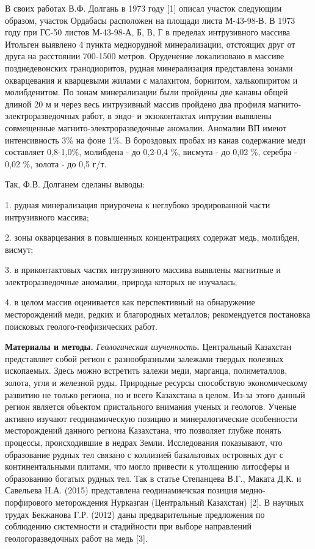 \begin{multicols}{2}
В своих работах В.Ф. Долгань в 1973 году {[}1{]} описал участок
следующим образом, участок Ордабасы расположен на площади листа
М-43-98-В. В 1973 году при ГС-50 листов М-43-98-А, Б, В, Г в пределах
интрузивного массива Итольген выявлено 4 пункта меднорудной
минерализации, отстоящих друг от друга на расстоянии 700-1500 метров.
Оруденение локализовано в массиве позднедевонских гранодиоритов, рудная
минерализация представлена зонами окварцевания и кварцевыми жилами с
малахитом, борнитом, халькопиритом и молибденитом. По зонам
минерализации были пройдены две канавы общей длиной 20 м и через весь
интрузивный массив пройдено два профиля магнито-электроразведочных
работ, в эндо- и экзоконтактах интрузии выявлены совмещенные
магнито-электроразведочные аномалии. Аномалии ВП имеют интенсивность 3\%
на фоне 1\%. В бороздовых пробах из канав содержание меди составляет
0,8-1,0\%, молибдена - до 0,2-0,4 \%, висмута - до 0,02 \%, серебра -
0,02 \%, золота - до 0,5 г/т.

Так, Ф.В. Долганем сделаны выводы:

1. рудная минерализация приурочена к неглубоко эродированной части
интрузивного массива;

2. зоны окварцевания в повышенных концентрациях содержат медь, молибден,
висмут;

3. в приконтактовых частях интрузивного массива выявлены магнитные и
электроразведочные аномалии, природа которых не изучалась;

4. в целом массив оценивается как перспективный на обнаружение
месторождений меди, редких и благородных металлов; рекомендуется
постановка поисковых геолого-геофизических работ.

{\bfseries Материалы и методы.} \emph{Геологическая изученность}{\bfseries .}
Центральный Казахстан представляет собой регион с разнообразными
залежами твердых полезных ископаемых. Здесь можно встретить залежи меди,
марганца, полиметаллов, золота, угля и железной руды. Природные ресурсы
способствую экономическому развитию не только региона, но и всего
Казахстана в целом. Из-за этого данный регион является объектом
пристального внимания ученых и геологов. Ученые активно изучают
геодинамическую позицию и минералогические особенности месторождений
данного региона Казахстана, что позволяет глубже понять процессы,
происходившие в недрах Земли. Исследования показывают, что образование
рудных тел связано с коллизией базальтовых островных дуг с
континентальными плитами, что могло привести к утолщению литосферы и
образованию богатых рудных тел. Так в статье Степанцева В.Г., Маката
Д.К. и Савельева Н.А. (2015) представлена геодинамиечская позиция
медно-порфирового меторождения Нурказган (Центральный Казахстан)
{[}2{]}. В научных трудах Бекжанова Г.Р. (2012) даны предварительные
предложения по соблюдению системности и стадийности при выборе
направлений геологоразведочных работ на медь {[}3{]}.


\end{multicols}

